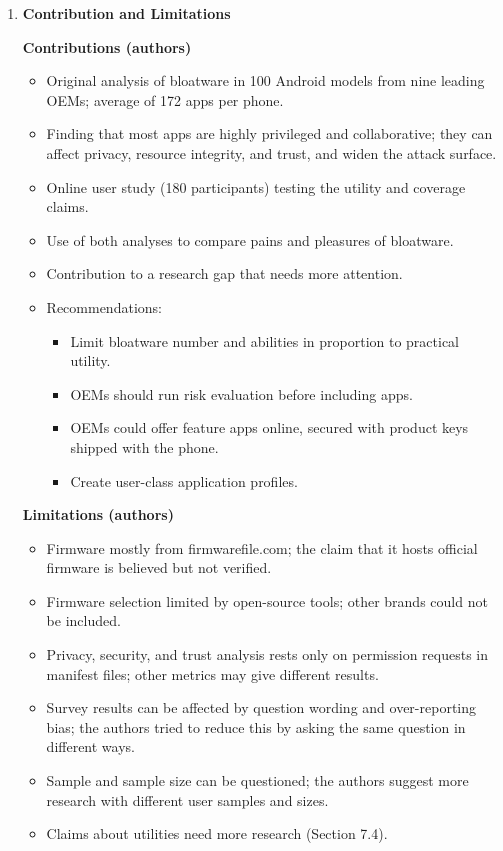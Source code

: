 \documentclass[11pt,a4paper]{article}
\newcommand{\entrypart}[1]{\textbf{\color{accent}#1}\par\vspace{2pt}}
\begin{document}
\begin{enumerate}
    \item \entrypart{Contribution and Limitations}

    \textbf{Contributions (authors)}
    \begin{itemize}[leftmargin=*, itemsep=1pt, topsep=2pt]
        \item Original analysis of bloatware in 100 Android models from nine leading OEMs; average of 172 apps per phone.
        \item Finding that most apps are highly privileged and collaborative; they can affect privacy, resource integrity, and trust, and widen the attack surface.
        \item Online user study (180 participants) testing the utility and coverage claims.
        \item Use of both analyses to compare pains and pleasures of bloatware.
        \item Contribution to a research gap that needs more attention.
        \item Recommendations:
        \begin{itemize}[itemsep=0pt]
            \item Limit bloatware number and abilities in proportion to practical utility.
            \item OEMs should run risk evaluation before including apps.
            \item OEMs could offer feature apps online, secured with product keys shipped with the phone.
            \item Create user-class application profiles.
        \end{itemize}
    \end{itemize}

    \vspace{4pt}
    \textbf{Limitations (authors)}
    \begin{itemize}[leftmargin=*, itemsep=1pt, topsep=2pt]
        \item Firmware mostly from firmwarefile.com; the claim that it hosts official firmware is believed but not verified.
        \item Firmware selection limited by open-source tools; other brands could not be included.
        \item Privacy, security, and trust analysis rests only on permission requests in manifest files; other metrics may give different results.
        \item Survey results can be affected by question wording and over-reporting bias; the authors tried to reduce this by asking the same question in different ways.
        \item Sample and sample size can be questioned; the authors suggest more research with different user samples and sizes.
        \item Claims about utilities need more research (Section 7.4).
    \end{itemize}


\end{enumerate}
\end{document}
